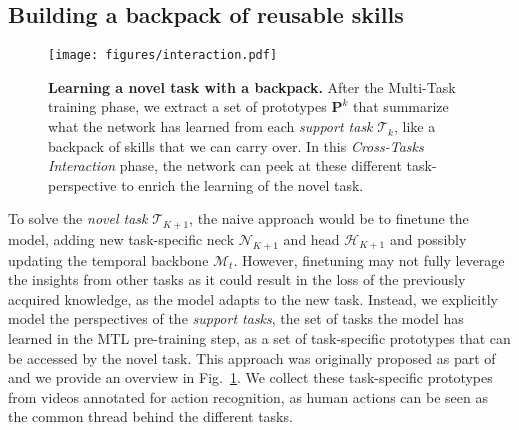 \subsection{Building a backpack of reusable skills}\label{sec:method_egopack}
\begin{figure}
    \centering
    \texttt{[image: figures/interaction.pdf]}
    \vspace{-.25cm}
    \caption{
        \textbf{Learning a novel task with a backpack.}
        After the Multi-Task training phase, we extract a set of prototypes $\mathbf{P}^k$ that summarize what the network has learned from each \emph{support task} $\mathcal{T}_k$, like a backpack of skills that we can carry over.
        In this \emph{Cross-Tasks Interaction} phase, the network can peek at these different task-perspective to enrich the learning of the novel task.
    }\label{fig:interaction}
\end{figure}
To solve the \emph{novel task} $\mathcal{T}_{K+1}$, the naive approach would be to finetune the model, adding new task-specific neck $\mathcal{N}_{K+1}$ and head $\mathcal{H}_{K+1}$ and possibly updating the temporal backbone $\mathcal{M}_{t}$.
However, finetuning may not fully leverage the insights from other tasks as it could result in the loss of the previously acquired knowledge, as the model adapts to the new task.
Instead, we explicitly model the perspectives of the \emph{support tasks}, \ie the set of tasks the model has learned in the MTL pre-training step, as a set of task-specific prototypes that can be accessed by the novel task.
% 
This approach was originally proposed as part of \ourscvpr\cite{egopack} and we provide an overview in Fig.~\ref{fig:interaction}.
We collect these task-specific prototypes from videos annotated for action recognition, as human actions can be seen as the common thread behind the different tasks.

